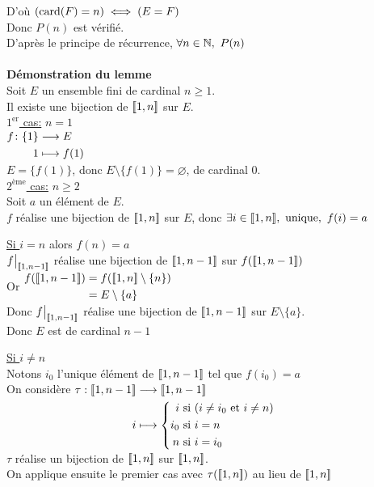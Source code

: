 \documentclass[12pt,twoside,a4paper]{article}
\begin{document}
\begin{preuve}
		D'où $(\text{card}(F)=n)\iff(E=F)$\\
		Donc $P(n)$ est v\'erifi\'e.\\
		D'apr\`es le principe de r\'ecurrence, $\forall n\in\mathbb{N},\ P(n)$\\
		\\
		\textbf{D\'emonstration du lemme}\\
		Soit $E$ un ensemble fini de cardinal $n\geqslant 1$.\\
		Il existe une bijection de $[\![ 1,n]\!]$ sur $E$.\\
		\underline{$1^{\text{er}}$ cas:} $n=1$\\
		$\begin{aligned}[t]f\colon\{1\}&\longrightarrow E \\1&\longmapsto f(1)\end{aligned}$\\
		$E=\{f(1)\}$, donc $E\setminus \{f(1)\}=\varnothing$, de cardinal $0$.\\
		\underline{$2^{\text{\`eme}}$ cas:} $n\geqslant 2$\\
		Soit $a$ un \'el\'ement de $E$.\\
		$f$ r\'ealise une bijection de $[\![ 1,n]\!]$ sur $E$, donc $\exists i\in \lbracket 1,n\rbracket,\ \text{unique},\ f(i)=a$
		\begin{liste}
			\item \underline{Si $i=n$} alors $f(n)=a$\\
				$\restr{f}{\lbracket 1,n-1\rbracket}$ r\'ealise une bijection de $[\![ 1,n-1]\!]$ sur $f([\![ 1,n-1]\!])$\\
				Or $\begin{aligned}
				f([\![ 1,n-1]\!])&=f([\![ 1,n]\!]\setminus\{n\})\\
					&=E\setminus \{a\}
				\end{aligned}$\\
				Donc $\restr{f}{\lbracket 1,n-1\rbracket}$ r\'ealise une bijection de $[\![ 1,n-1]\!]$ sur $E\setminus \{a\}$.\\
				Donc $E$ est de cardinal $n-1$
			\item \underline{Si $i\neq n$}\\
				Notons $i_0$ l'unique \'el\'ement de $[\![ 1,n-1]\!]$ tel que $f(i_0)=a$\\
				On consid\`ere 
				$\begin{aligned}[t]
				\tau:[\![ 1,n-1]\!] &\longrightarrow [\![ 1,n-1]\!]\\
					i &\longmapsto 
					\left\{\begin{aligned}
					 i &\text{ si }(i\neq i_0\text{ et } i\neq n)\\
					 i_0 &\text{ si } i=n\\
					 n &\text{ si } i=i_0
					\end{aligned}\right.
				\end{aligned}$\\
				$\tau$ r\'ealise un bijection de $[\![ 1,n]\!]$ sur $[\![ 1,n]\!]$.\\
				On applique ensuite le premier cas avec $\tau([\![ 1,n]\!])$ au lieu de $[\![ 1,n]\!]$
		\end{liste}
	\end{preuve}
\end{document}
